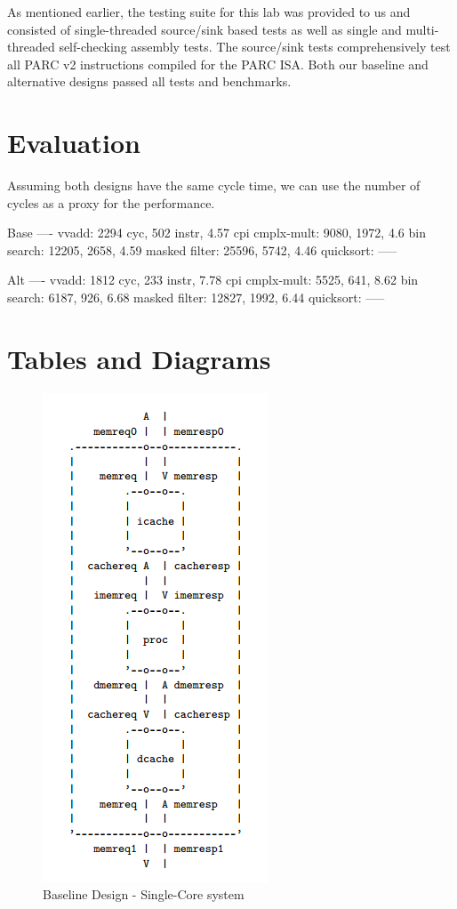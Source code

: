 \documentclass[10pt]{article}
\begin{document}
As mentioned earlier, the testing suite for this lab was provided to us and consisted of single-threaded source/sink based tests as well as single and multi-threaded self-checking assembly tests. The source/sink tests comprehensively test all PARC v2 instructions compiled for the PARC ISA. Both our baseline and alternative designs passed all tests and benchmarks. 



\section{Evaluation}

Assuming both designs have the same cycle time, we can use
the number of cycles as a proxy for the performance.

Base
----
vvadd:     2294 cyc, 502 instr, 4.57 cpi
cmplx-mult: 9080, 1972, 4.6
bin search: 12205, 2658, 4.59
masked filter: 25596, 5742, 4.46
quicksort: -----

Alt
----
vvadd:     1812 cyc, 233 instr, 7.78 cpi
cmplx-mult: 5525, 641, 8.62
bin search: 6187, 926, 6.68
masked filter: 12827, 1992, 6.44
quicksort: -----


\newpage
\section {Tables and Diagrams}


\begin{figure}[H]
	\centering
	\includegraphics{bline_diag}
	\caption{Baseline Design - Single-Core system}
	\label{fig:bline}
\end{figure}
\end{document}
